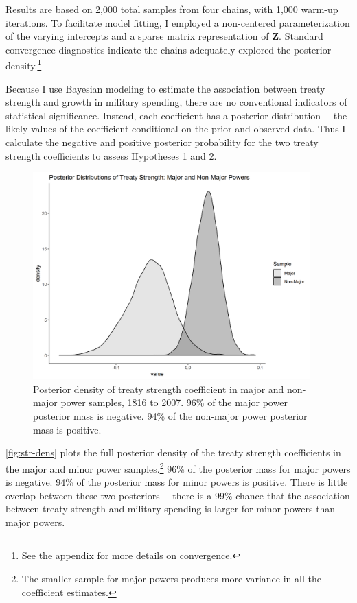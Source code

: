 \documentclass[12pt]{article}
\begin{document}
Results are based on 2,000 total samples from four chains, with 1,000 warm-up iterations. 
To facilitate model fitting, I employed a non-centered parameterization of the varying intercepts and a sparse matrix representation of \textbf{Z}. 
Standard convergence diagnostics indicate the chains adequately explored the posterior density.\footnote{See the appendix for more details on convergence.} 


Because I use Bayesian modeling to estimate the association between treaty strength and growth in military spending, there are no conventional indicators of statistical significance. 
Instead, each coefficient has a posterior distribution--- the likely values of the coefficient conditional on the prior and observed data. 
Thus I calculate the negative and positive posterior probability for the two treaty strength coefficients to assess Hypotheses 1 and 2.


\begin{figure}[htbp]
	\centering
		\includegraphics[width=0.95\textwidth]{../figures/str-dens.png}
	\caption{Posterior density of treaty strength coefficient in major and non-major power samples, 1816 to 2007. 96\% of the major power posterior mass is negative. 94\% of the non-major power posterior mass is positive.}
	\label{fig:str-dens}
\end{figure}


\autoref{fig:str-dens} plots the full posterior density of the treaty strength coefficients in the major and minor power samples.\footnote{The smaller sample for major powers produces more variance in all the coefficient estimates.} 
96\% of the posterior mass for major powers is negative. 
94\% of the posterior mass for minor powers is positive. 
There is little overlap between these two posteriors--- there is a 99\% chance that the association between treaty strength and military spending is larger for minor powers than major powers. 
\end{document}
